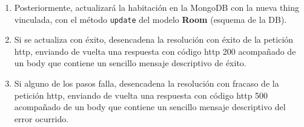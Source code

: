 \begin{enumerate}
\item  Posteriormente, actualizará la habitación en la MongoDB con la nueva thing vinculada, con el método \verb|update| del modelo \textbf{Room} (esquema de la DB).

\item  Si se actualiza con éxito, desencadena la resolución con éxito de la petición http, enviando de vuelta una respuesta con código http 200 acompañado de un body que contiene un sencillo mensaje descriptivo de éxito.

\item  Si alguno de los pasos falla, desencadena la resolución con fracaso de la petición http, enviando de vuelta una respuesta con código http 500 acompañado de un body que contiene un sencillo mensaje descriptivo del error ocurrido.
\end{enumerate}

